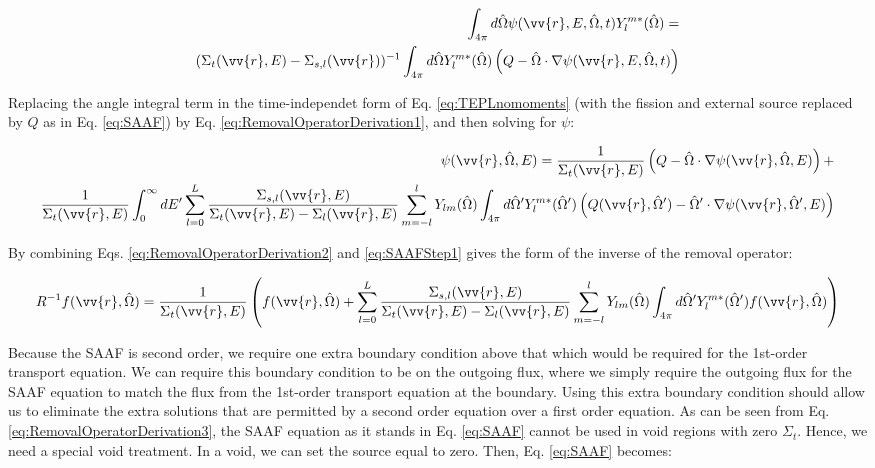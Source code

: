 \documentclass[10pt]{article}
\newcommand{\hO}{\hat{\Omega}}
\begin{document}
\begin{flushleft}
\begin{equation}
\label{eq:RemovalOperatorDerivation1}
\begin{aligned}
 \int_{4\pi}^{}d\hO   \psi(\vv{r}, E, \hO  ,t)Y_l^{m*}(\hO  ) = \\
 (\Sigma_t(\vv{r},E) - \Sigma_{s,l}(\vv{r}))^{-1}\int_{4\pi}^{} d\hO  Y_l^{m*}(\hO  ) \left(Q - \hO  \cdot\nabla\psi(\vv{r}, E, \hO  ,t)\right)
\end{aligned}
\end{equation}

Replacing the angle integral term in the time-independet form of Eq. \ref{eq:TEPLnomoments} (with the fission and external source replaced by \(Q\) as in Eq. \ref{eq:SAAF}) by Eq. \ref{eq:RemovalOperatorDerivation1}, and then solving for \(\psi\):

\begin{equation}
\label{eq:RemovalOperatorDerivation2}
\begin{aligned}
\psi(\vv{r}, \hO  , E) = \frac{1} {\Sigma_t(\vv{r}, E)} \left(Q - \hO  \cdot\nabla\psi(\vv{r}, \hO  , E)\right) +\\
\frac{1}{\Sigma_t(\vv{r}, E)} \int_{0}^{\infty}dE' \sum_{l=0}^{L} \frac{\Sigma_{s,l}(\vv{r}, E)}{\Sigma_t(\vv{r}, E) - \Sigma_l(\vv{r}, E)} \sum_{m=-l}^{l}  Y_{lm}(\hO  ) \int_{4\pi}^{} d\hO  ' Y_l^{m*}(\hO  ') \left(Q(\vv{r}, \hO  ') - \hO  '\cdot\nabla\psi(\vv{r}, \hO  ', E)\right)
\end{aligned}
\end{equation}

By combining Eqs. \ref{eq:RemovalOperatorDerivation2} and \ref{eq:SAAFStep1} gives the form of the inverse of the removal operator:

\begin{equation}
\label{eq:RemovalOperatorDerivation3}
R^{-1} f(\vv{r}, \hO  ) = \frac{1}{\Sigma_t(\vv{r}, E)} \left(f(\vv{r}, \hO  ) + \sum_{l=0}^{L} \frac{\Sigma_{s,l}(\vv{r}, E)}{\Sigma_t(\vv{r}, E) - \Sigma_l(\vv{r}, E)}\sum_{m=-l}^{l}  Y_{lm}(\hO  )\int_{4\pi}^{} d\hO  ' Y_l^{m*}(\hO  ') f(\vv{r}, \hO  )\right)
\end{equation}

Because the SAAF is second order, we require one extra boundary condition above that which would be required for the 1st-order transport equation. We can require this boundary condition to be on the outgoing flux, where we simply require the outgoing flux for the SAAF equation to match the flux from the 1st-order transport equation at the boundary. Using this extra boundary condition should allow us to eliminate the extra solutions that are permitted by a second order equation over a first order equation. As can be seen from Eq. \ref{eq:RemovalOperatorDerivation3}, the SAAF equation as it stands in Eq. \ref{eq:SAAF} cannot be used in void regions with zero \(\Sigma_t\). Hence, we need a special void treatment. In a void, we can set the source equal to zero. Then, Eq. \ref{eq:SAAF} becomes:


\end{flushleft}
\end{document}
